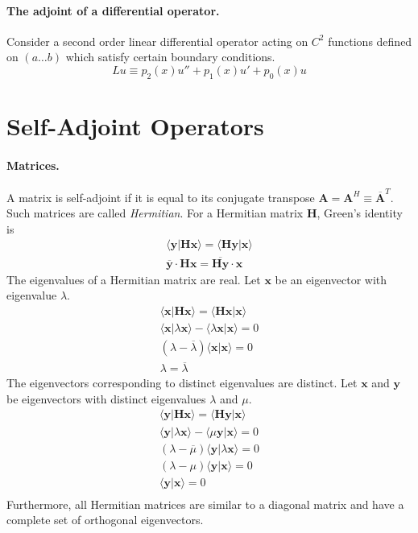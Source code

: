 \paragraph{The adjoint of a differential operator.}
Consider a second order linear differential operator acting on $C^2$ functions
defined on $(a \ldots b)$ which satisfy certain boundary conditions.
\[
L u \equiv p_2(x) u'' + p_1(x) u' + p_0(x) u
\]




\section{Self-Adjoint Operators}


\paragraph{Matrices.}
A matrix is self-adjoint if it is equal to its conjugate transpose
$\mathbf{A} = \mathbf{A}^H \equiv \overline{\mathbf{A}}^T$.  Such matrices are called 
\textit{Hermitian}.   For a Hermitian matrix $\mathbf{H}$, Green's identity is 
\begin{gather*}
  \langle \mathbf{y} | \mathbf{H} \mathbf{x} \rangle = \langle \mathbf{H} \mathbf{y} | \mathbf{x} \rangle \\
  \overline{\mathbf{y}} \cdot \mathbf{H} \mathbf{x} = \overline{\mathbf{H} \mathbf{y}} \cdot \mathbf{x}
\end{gather*}
The eigenvalues of a Hermitian matrix are real.
Let $\mathbf{x}$ be an eigenvector with eigenvalue $\lambda$.
\begin{gather*}
  \langle \mathbf{x} | \mathbf{H} \mathbf{x} \rangle = \langle \mathbf{H} \mathbf{x} | \mathbf{x} \rangle \\
  \langle \mathbf{x} | \lambda \mathbf{x} \rangle - \langle \lambda \mathbf{x} | \mathbf{x} \rangle = 0 \\
  (\lambda - \overline{\lambda}) \langle \mathbf{x} | \mathbf{x} \rangle = 0 \\
  \lambda = \overline{\lambda}
\end{gather*}
The eigenvectors corresponding to distinct eigenvalues are distinct.
Let $\mathbf{x}$ and $\mathbf{y}$ be eigenvectors with distinct eigenvalues $\lambda$ and 
$\mu$.
\begin{gather*}
  \langle \mathbf{y} | \mathbf{H} \mathbf{x} \rangle = \langle \mathbf{H} \mathbf{y} | \mathbf{x} \rangle \\
  \langle \mathbf{y} | \lambda \mathbf{x} \rangle - \langle \mu \mathbf{y} | \mathbf{x} \rangle = 0 \\
  (\lambda - \overline{\mu}) \langle \mathbf{y} | \lambda \mathbf{x} \rangle = 0 \\
  (\lambda - \mu) \langle \mathbf{y} | \mathbf{x} \rangle = 0 \\
  \langle \mathbf{y} | \mathbf{x} \rangle = 0 \\
\end{gather*}
Furthermore, all Hermitian matrices are similar to a diagonal matrix and 
have a complete set of orthogonal eigenvectors.




